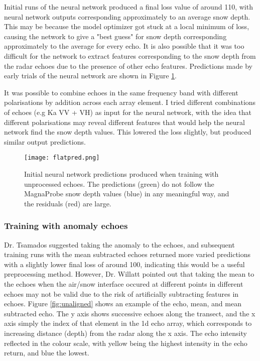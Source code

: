 \documentclass[11pt, a4paper]{article}
\begin{document}
Initial runs of the neural network produced a final loss value of around 110, with neural network outputs corresponding approximately to an average snow depth.  This may be because the model optimizer got stuck at a local minimum of loss,  causing the network to give a "best guess" for snow depth corresponding approximately to the average for every echo.  It is also possible that it was too difficult for the network to extract features corresponding to the snow depth from the radar echoes due to the presence of other echo features.  Predictions made by early trials of the neural network are shown in Figure \ref{fig:flat}.

It was possible to combine echoes in the same frequency band with different polarisations by addition across each array element.  I tried different combinations of echoes (e.g Ka VV + VH) as input for the neural network, with the idea that different polarisations may reveal different features that would help the neural network find the snow depth values. This lowered the loss slightly,  but produced similar output predictions.

\begin{figure}[H]
\centering
   		 \texttt{[image: flatpred.png]}
    		\caption{Initial neural network predictions produced when training with unprocessed echoes. The predictions (green) do not follow the MagnaProbe snow depth values (blue) in any meaningful way, and the residuals (red) are large.}
	\label{fig:flat}
\end{figure}

\subsubsection{Training with anomaly echoes}

Dr. Tsamados suggested taking the anomaly to the echoes, and subsequent training runs with the mean subtracted echoes returned more varied predictions with a slightly lower final loss of around 100, indicating this would be a useful preprocessing method.  However, Dr. Willatt pointed out that taking the mean to the echoes when the air/snow interface occured at different points in different echoes may not be valid due to the risk of artificially subtracting features in echoes.  Figure \ref{fig:unaligned} shows an example of the echo, mean, and mean subtracted echo. The y axis shows successive echoes along the transect, and the x axis simply the index of that element in the 1d echo array, which corresponds to increasing distance (depth) from the radar along the x axis. The echo intensity reflected in the colour scale, with yellow being the highest intensity in the echo return, and blue the lowest.
\end{document}
